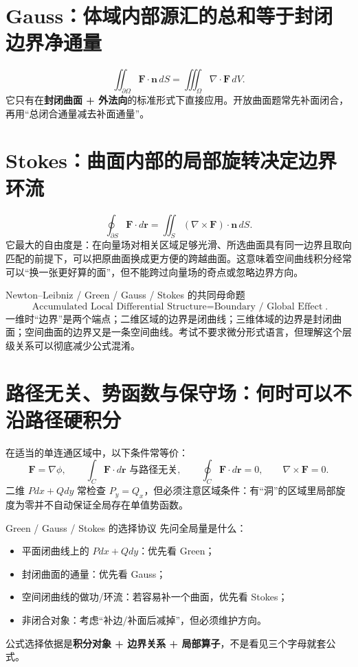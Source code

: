 \documentclass[11pt,a4paper,openany]{ctexbook}
\newcommand{\key}[1]{\textbf{\color{deep}#1}}
\begin{document}
\section{Gauss：体域内部源汇的总和等于封闭边界净通量}
\[
\iint_{\partial\Omega}\bm F\cdot\bm n\,dS
=
\iiint_\Omega \nabla\cdot\bm F\,dV.
\]
它只有在\key{封闭曲面 + 外法向}的标准形式下直接应用。开放曲面题常先补面闭合，再用“总闭合通量减去补面通量”。

\section{Stokes：曲面内部的局部旋转决定边界环流}
\[
\oint_{\partial S}\bm F\cdot d\bm r
=
\iint_S(\nabla\times\bm F)\cdot\bm n\,dS.
\]
它最大的自由度是：在向量场对相关区域足够光滑、所选曲面具有同一边界且取向匹配的前提下，可以把原曲面换成更方便的跨越曲面。这意味着空间曲线积分经常可以“换一张更好算的面”，但不能跨过向量场的奇点或忽略边界方向。

\begin{corebox}{Newton--Leibniz / Green / Gauss / Stokes 的共同母命题}
\[
\boxed{\text{Accumulated Local Differential Structure}=\text{Boundary / Global Effect}}.
\]
一维时“边界”是两个端点；二维区域的边界是闭曲线；三维体域的边界是封闭曲面；空间曲面的边界又是一条空间曲线。考试不要求微分形式语言，但理解这个层级关系可以彻底减少公式混淆。
\end{corebox}

\section{路径无关、势函数与保守场：何时可以不沿路径硬积分}
在适当的单连通区域中，以下条件常等价：
\[
\bm F=\nabla\phi,
\qquad
\int_C\bm F\cdot d\bm r\text{ 与路径无关},
\qquad
\oint_C\bm F\cdot d\bm r=0,
\qquad
\nabla\times\bm F=0.
\]
二维 $Pdx+Qdy$ 常检查 $P_y=Q_x$，但必须注意区域条件：有“洞”的区域里局部旋度为零并不自动保证全局存在单值势函数。

\begin{examBox}{Green / Gauss / Stokes 的选择协议}
先问全局量是什么：
\begin{itemize}
  \item 平面闭曲线上的 $Pdx+Qdy$：优先看 Green；
  \item 封闭曲面的通量：优先看 Gauss；
  \item 空间闭曲线的做功/环流：若容易补一个曲面，优先看 Stokes；
  \item 非闭合对象：考虑“补边/补面后减掉”，但必须维护方向。
\end{itemize}
公式选择依据是\key{积分对象 + 边界关系 + 局部算子}，不是看见三个字母就套公式。
\end{examBox}
\end{document}
